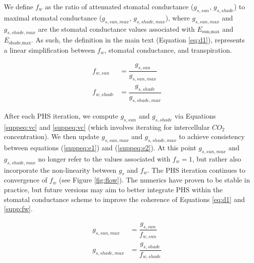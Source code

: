 \documentclass[draft,linenumbers]{agujournal}
\begin{document}
We define $f_w$ as the ratio of attenuated stomatal conductance ($g_{s,sun}$, $g_{s,shade}$) to maximal stomatal conductance ($g_{s,sun,max}$, $g_{s,shade,max}$),
where $g_{s,sun,max}$ and $g_{s,shade,max}$ are the stomatal conductance values associated with $E_{\text{sun,max}}$ and $E_{\text{shade,max}}$.
As such, the definition in the main text (Equation \ref{eq:d1}), represents a linear simplification between $f_w$, stomatal conductance, and transpiration.

    \begin{equation}
    \begin{aligned}
    \label{supp:fw}
    f_{w,sun} &= \dfrac{g_{s,sun}}{g_{s,sun,max}}    \\
    f_{w,shade} &= \dfrac{g_{s,shade}}{g_{s,shade,max}}
    \end{aligned}
    \end{equation}

After each PHS iteration, we compute $g_{s,sun}$ and $g_{s,shade}$ via Equations \ref{suppeq:vc} and \ref{suppeq:vc} (which involves iterating for intercellular $CO_2$ concentration).
We then update $g_{s,sun,max}$ and $g_{s,shade,max}$ to achieve consistency between equations (\ref{suppeq:e1}) and (\ref{suppeq:e2}).
At this point $g_{s,sun,max}$ and $g_{s,shade,max}$ no longer refer to the values associated with $f_w=1$, but rather also incorporate the non-linearity between $g_s$ and $f_w$.
The PHS iteration continues to convergence of $f_w$ (see Figure \ref{fig:flow}).
The numerics have proven to be stable in practice, but future versions may aim to better integrate PHS within the stomatal conductance scheme to improve the coherence of Equations \ref{eq:d1} and \ref{supp:fw}.

    \begin{equation}
    \begin{aligned}
    g_{s,sun,max} &= \dfrac{g_{s,sun}}{f_{w,sun}} \\
    g_{s,shade,max} &= \dfrac{g_{s,shade}}{f_{w,shade}} \\
    \end{aligned}
    \end{equation}
    
\end{document}
